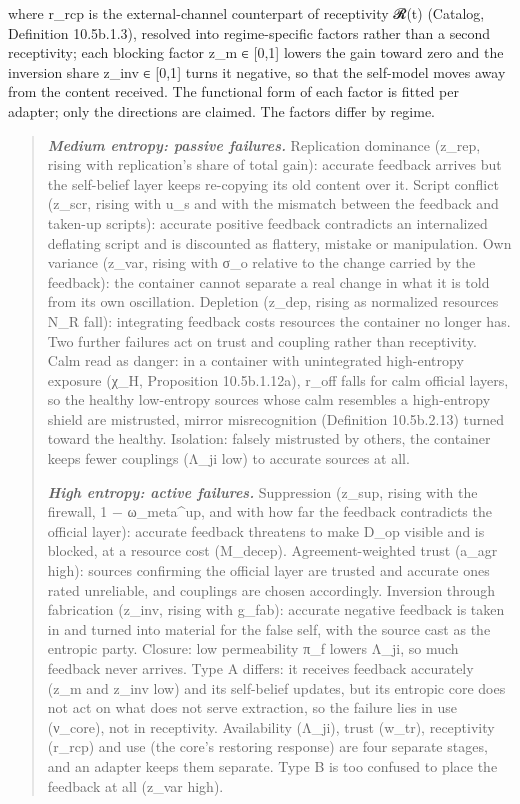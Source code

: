 \documentclass[
]{article}
\begin{document}
where r\_rcp is the external-channel counterpart of receptivity 𝓡(t)
(Catalog, Definition 10.5b.1.3), resolved into regime-specific factors
rather than a second receptivity; each blocking factor z\_m ∈ {[}0,1{]}
lowers the gain toward zero and the inversion share z\_inv ∈ {[}0,1{]}
turns it negative, so that the self-model moves away from the content
received. The functional form of each factor is fitted per adapter; only
the directions are claimed. The factors differ by regime.

\begin{quote}
\emph{\textbf{Medium entropy: passive failures.}} Replication dominance
(z\_rep, rising with replication's share of total gain): accurate
feedback arrives but the self-belief layer keeps re-copying its old
content over it. Script conflict (z\_scr, rising with u\_s and with the
mismatch between the feedback and taken-up scripts): accurate positive
feedback contradicts an internalized deflating script and is discounted
as flattery, mistake or manipulation. Own variance (z\_var, rising with
σ\_o relative to the change carried by the feedback): the container
cannot separate a real change in what it is told from its own
oscillation. Depletion (z\_dep, rising as normalized resources N\_R
fall): integrating feedback costs resources the container no longer has.
Two further failures act on trust and coupling rather than receptivity.
Calm read as danger: in a container with unintegrated high-entropy
exposure (χ\_H, Proposition 10.5b.1.12a), r\_off falls for calm official
layers, so the healthy low-entropy sources whose calm resembles a
high-entropy shield are mistrusted, mirror misrecognition (Definition
10.5b.2.13) turned toward the healthy. Isolation: falsely mistrusted by
others, the container keeps fewer couplings (Λ\_ji low) to accurate
sources at all.

\emph{\textbf{High entropy: active failures.}} Suppression (z\_sup,
rising with the firewall, 1 − ω\_meta\^{}up, and with how far the
feedback contradicts the official layer): accurate feedback threatens to
make D\_op visible and is blocked, at a resource cost (M\_decep).
Agreement-weighted trust (a\_agr high): sources confirming the official
layer are trusted and accurate ones rated unreliable, and couplings are
chosen accordingly. Inversion through fabrication (z\_inv, rising with
g\_fab): accurate negative feedback is taken in and turned into material
for the false self, with the source cast as the entropic party. Closure:
low permeability π\_f lowers Λ\_ji, so much feedback never arrives. Type
A differs: it receives feedback accurately (z\_m and z\_inv low) and its
self-belief updates, but its entropic core does not act on what does not
serve extraction, so the failure lies in use (ν\_core), not in
receptivity. Availability (Λ\_ji), trust (w\_tr), receptivity (r\_rcp)
and use (the core's restoring response) are four separate stages, and an
adapter keeps them separate. Type B is too confused to place the
feedback at all (z\_var high).
\end{quote}
\end{document}
